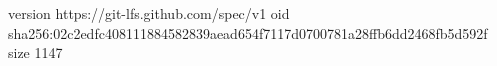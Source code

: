 version https://git-lfs.github.com/spec/v1
oid sha256:02c2edfc408111884582839aead654f7117d0700781a28ffb6dd2468fb5d592f
size 1147
